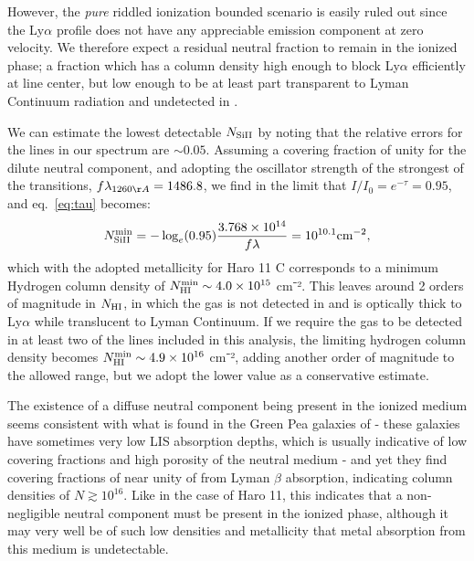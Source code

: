 \documentclass[twocolumn]{aastex61}
\begin{document}
However, the \emph{pure} riddled ionization bounded scenario is easily
ruled out since the Ly$\alpha$ profile does not have any appreciable
emission component at zero velocity. We therefore expect a residual
neutral fraction to remain in the ionized phase; a fraction which has a
column density high enough to block Ly$\alpha$ efficiently at line
center, but low enough to be at least part transparent to Lyman
Continuum radiation and undetected in .

We can estimate the lowest detectable $N_{\rm Si II}$ by noting that the
relative errors for the  lines in our spectrum are
$\sim 0.05$. Assuming a covering fraction of unity for the dilute
neutral component, and adopting the oscillator strength of the strongest
of the  transitions, $f\lambda_{1260 \AA} = 1486.8$, we find
in the limit that $I/I_0 = e^{-\tau} = 0.95$, and eq.~\ref{eq:tau}
becomes:
%
\begin{equation}
\label{eq:silim}
N_{\rm Si II}^{\rm min} = -\log_{e}(0.95) \frac{3.768 \times 10^{14}}{f\lambda} 
    = 10^{10.1} \text{cm}^{-2},
\end{equation}
%
 which with the adopted metallicity for Haro 11 C corresponds to a
minimum Hydrogen column density of
$N_{\rm HI}^{\rm min} \sim 4.0 \times 10^{15}$ cm⁻². This leaves around
2 orders of magnitude in $N_{\rm H I}$, in which the gas is not detected
in  and is optically thick to Ly$\alpha$ while translucent to
Lyman Continuum. If we require the gas to be detected in at least two of
the lines included in this analysis, the limiting hydrogen column
density becomes $N_{\rm HI}^{\rm min} \sim 4.9 \times 10^{16}$ cm⁻²,
adding another order of magnitude to the allowed range, but we adopt the
lower value as a conservative estimate.

The existence of a diffuse neutral component being present in the
ionized medium seems consistent with what is found in the Green Pea
galaxies of \citep{Henry2015} - these galaxies have sometimes very low
LIS absorption depths, which is usually indicative of low covering
fractions and high porosity of the neutral medium - and yet they find
covering fractions of near unity of  from Lyman $\beta$
absorption, indicating column densities of $N \gtrsim 10^{16}$. Like in
the case of Haro 11, this indicates that a non-negligible neutral
component must be present in the ionized phase, although it may very
well be of such low densities and metallicity that metal absorption from
this medium is undetectable.
\end{document}
